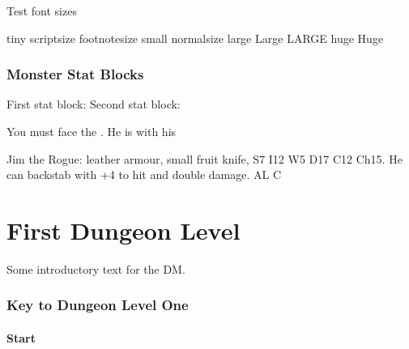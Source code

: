 \documentclass[a4paper,serif]{module}       %
\begin{document}
Test font sizes

{\tiny tiny}
{\scriptsize scriptsize}
{\footnotesize footnotesize}
{\small small}
{\normalsize normalsize}
{\large large}
{\Large Large}
{\LARGE LARGE}
{\huge huge}
{\Huge Huge}

\section{Monster Stat Blocks}


First stat block:
Second stat block:

You must face the . 
He is with his 




\begin{statblockfreestyle}
Jim the Rogue: leather armour, small fruit knife, S7 I12 W5 D17 C12 Ch15. He can backstab with +4 to hit and double damage. AL C
\end{statblockfreestyle}


\part{First Dungeon Level}

Some introductory text for the DM.

\section*{Key to Dungeon Level One}

\subsection*{Start}

\end{document}
